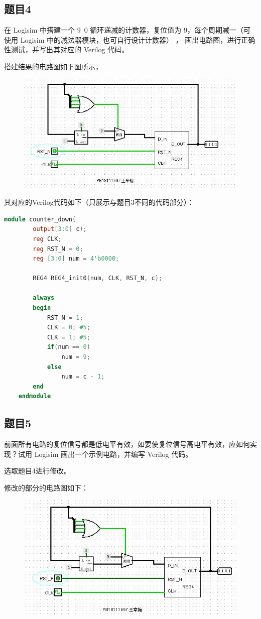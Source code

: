 \documentclass[UTF8]{article}
\begin{document}
	\subsection{题目4}
	在 Logisim 中搭建一个 9~0 循环递减的计数器，复位值为 9，每个周期减一（可使用 Logisim 中的减法器模块，也可自行设计计数器） ， 画出电路图，进行正确性测试，并写出其对应的 Verilog 代码。\par
	搭建结果的电路图如下图所示，
	\begin{figure}[H]
		\centering
		\includegraphics[width=1\linewidth]{e4_counter.jpg}
		\label{e4_counter}
	\end{figure}
	
	
	其对应的Verilog代码如下（只展示与题目3不同的代码部分）：
	\begin{lstlisting}[language = Verilog, name=向下9到0计数]
	module counter_down(
		output[3:0] c);
		reg CLK;
		reg RST_N = 0;
		reg [3:0] num = 4'b0000;
		
		REG4 REG4_init0(num, CLK, RST_N, c);
		
		always
		begin
			RST_N = 1;
			CLK = 0; #5; 
			CLK = 1; #5;
			if(num == 0)
				num = 9;
			else
				num = c - 1;
		end
	endmodule
	\end{lstlisting}
	
	
	
	\subsection{题目5}
	前面所有电路的复位信号都是低电平有效，如要使复位信号高电平有效，应如何实现？试用 Logisim 画出一个示例电路，并编写	Verilog 代码。\par
	选取题目4进行修改。\par
	修改的部分的电路图如下：
	\begin{figure}[H]
		\centering
		\includegraphics[width=1\linewidth]{e5_counter.jpg}
		\label{e5_counter}
	\end{figure}
	
\end{document}
